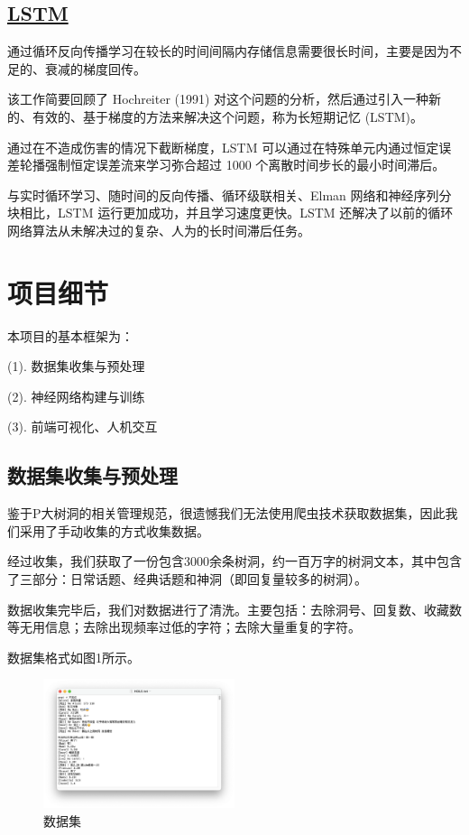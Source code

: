 \documentclass[12pt,a4paper]{article}
\begin{document}
\subsection{\href{https://pubmed.ncbi.nlm.nih.gov/9377276/}{LSTM}}
通过循环反向传播学习在较长的时间间隔内存储信息需要很长时间，主要是因为不足的、衰减的梯度回传。

该工作简要回顾了 Hochreiter (1991) 对这个问题的分析，然后通过引入一种新的、有效的、基于梯度的方法来解决这个问题，称为长短期记忆 (LSTM)。

通过在不造成伤害的情况下截断梯度，LSTM 可以通过在特殊单元内通过恒定误差轮播强制恒定误差流来学习弥合超过 1000 个离散时间步长的最小时间滞后。

与实时循环学习、随时间的反向传播、循环级联相关、Elman 网络和神经序列分块相比，LSTM 运行更加成功，并且学习速度更快。LSTM 还解决了以前的循环网络算法从未解决过的复杂、人为的长时间滞后任务。\cite{ref2}


\section{项目细节}
本项目的基本框架为：

(1). 数据集收集与预处理

(2). 神经网络构建与训练

(3). 前端可视化、人机交互

\subsection{数据集收集与预处理}
    鉴于P大树洞的相关管理规范，很遗憾我们无法使用爬虫技术获取数据集，因此我们采用了手动收集的方式收集数据。
    
    经过收集，我们获取了一份包含3000余条树洞，约一百万字的树洞文本，其中包含了三部分：日常话题、经典话题和神洞（即回复量较多的树洞）。
    
数据收集完毕后，我们对数据进行了清洗。主要包括：去除洞号、回复数、收藏数等无用信息；去除出现频率过低的字符；去除大量重复的字符。
    
    数据集格式如图1所示。
    
    \begin{figure}[!h]
        \centering
    \includegraphics[width=0.5\textwidth]{图片6.png}
        \caption{数据集}
    \end{figure}
    
\end{document}
